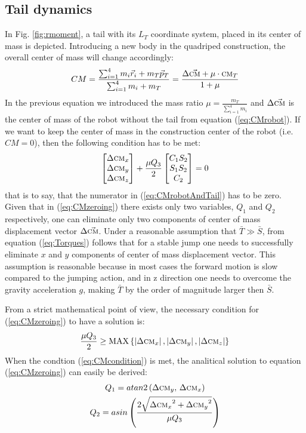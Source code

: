 \subsection{Tail dynamics}
In Fig. \ref{fig:rmoment}, a tail with its ${L_T}$ coordinate system, placed in its center of mass is depicted. Introducing a new body in the quadriped construction, the overall center of mass will change accordingly:
\begin{equation}\label{eq:CMrobotAndTail}
CM=\frac{\sum_{i=1}^{4}m_i\vec{r}_i+m_T\vec{p}_T}{\sum_{i=1}^{4}m_i+m_T}= \frac{\Delta\vec{\textsc{cm}}+\mu\cdot\textsc{cm}_T}{1+\mu}
\end{equation}
In the previous equation we introduced the mass ratio $\mu=\frac{m_T}{\sum_{i=1}^{4}m_i}$ and $\Delta\vec{\textsc{cm}}$ is the center of mass of the robot without the tail from equation (\ref{eq:CMrobot}). If we want to keep the center of mass in the construction center of the robot (i.e. $CM=0$), then the following condition has to be met:
\begin{equation}\label{eq:CMzeroing}
\begin{bmatrix}
\Delta \textsc{cm}_x\\ 
\Delta \textsc{cm}_y\\ 
\Delta \textsc{cm}_z
\end{bmatrix}+
\frac{\mu Q_3}{2}\begin{bmatrix}
C_1S_2\\ 
S_1S_2\\ 
C_2
\end{bmatrix}=0
\end{equation}
that is to say, that the numerator in (\ref{eq:CMrobotAndTail}) has to be zero. Given that in (\ref{eq:CMzeroing}) there exists only two variables, $Q_1$ and $Q_2$ respectively, one can eliminate only two components of center of mass displacement vector $\Delta \vec{\textsc{cm}}$. Under a reasonable assumption that $\bar{T}\gg \bar{S}$, from equation (\ref{eq:Torques}) follows that for a stable jump one needs to successfully eliminate $x$ and $y$ components of center of mass displacement vector. This assumption is reasonable because in most cases the forward motion is slow compared to the jumping action, and in z direction one needs to overcome the gravity acceleration $g$, making $\bar{T}$ by the order of magnitude larger then $\bar{S}$.

From a strict mathematical point of view, the necessary condition for (\ref{eq:CMzeroing}) to have a solution is:
\begin{equation}\label{eq:CMcondition}
\frac{\mu Q_3}{2}\geq \textup{MAX}\left \{ \left | \Delta \textsc{cm}_x \right |, \left | \Delta \textsc{cm}_y \right |,\left | \Delta \textsc{cm}_z \right |\right \}
\end{equation}
When the condtion (\ref{eq:CMcondition}) is met, the analitical solution to equation (\ref{eq:CMzeroing}) can easily be derived:
\begin{gather}
Q_1=atan2\left({\Delta \textsc{cm}_y},\, {\Delta \textsc{cm}_x}\right)\\
Q_2=asin\left(\frac{2\sqrt{{\Delta \textsc{cm}_x}^2+{\Delta \textsc{cm}_y}^2}}{\mu Q_3} \right)
\end{gather}


